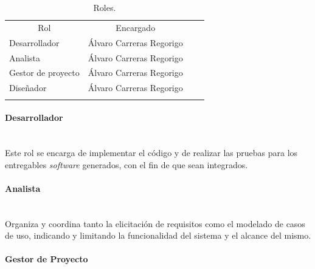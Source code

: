 \documentclass[twoside]{report}
\begin{document}
\begin{table}[H]
\begin{tabular}{llll}
\cline{1-2}
\multicolumn{1}{|c|}{Rol} & \multicolumn{1}{c|}{Encargado} &  &  \\ \cline{1-2}
\multicolumn{1}{|l|}{Desarrollador}                                      & \multicolumn{1}{l|}{Álvaro Carreras Regorigo}                                          &  &  \\ \cline{1-2}
\multicolumn{1}{|l|}{Analista}                                           & \multicolumn{1}{l|}{Álvaro Carreras Regorigo}                                          &  &  \\ \cline{1-2}
\multicolumn{1}{|l|}{Gestor de proyecto}                                 & \multicolumn{1}{l|}{Álvaro Carreras Regorigo}                                          &  &  \\ \cline{1-2}
\multicolumn{1}{|l|}{Diseñador}                                          & \multicolumn{1}{l|}{Álvaro Carreras Regorigo}                                                         &  &  \\ \cline{1-2}
                                                                         &                                                                               &  & 
\end{tabular}
\centering
\caption{Roles.}
\end{table}
\vspace{0.5cm}

\paragraph{Desarrollador}\mbox{}\\

Este rol se encarga de implementar el código y de realizar las pruebas para los entregables \textit{software} generados, con el fin de que sean integrados.

\paragraph{Analista}\mbox{}\\

Organiza y coordina tanto la elicitación de requisitos como el modelado de casos de uso, indicando y limitando la funcionalidad del sistema y el alcance del mismo.

\paragraph{Gestor de Proyecto}\mbox{}\\
\end{document}
